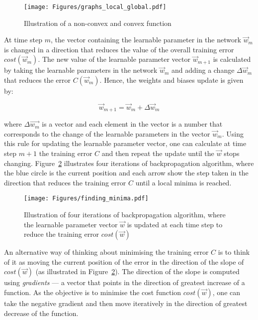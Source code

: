 \begin{figure}[ht!]
	\begin{center}
		\texttt{[image: Figures/graphs\_local\_global.pdf]}
	\end{center}
	\caption{Illustration of a non-convex and convex function}
	\label{Fig:local_global}
\end{figure} 

At time step $m$, the vector containing the learnable parameter in the network $\vec{w}_m$ is changed in a direction that reduces the value of the overall training error $cost(\vec{w}_m)$. The new value of the learnable parameter vector $\vec{w}_{m+1}$ is calculated by taking the learnable parameters in the network $\vec{w}_m$ and adding a change $\Delta\vec{w}_m$ that reduces the error $C(\vec{w}_m)$. Hence, the weights and biases update is given by:

\begin{equation*}
\vec{w}_{m+1}=\vec{w}_{m}+\Delta \vec{w}_{m}
\end{equation*}

where $\Delta \vec{w_m}$ is a vector and each element in the vector is a number that corresponds to the change of the learnable parameters in the vector $\vec{w}_m$. Using this rule for updating the learnable parameter vector, one can calculate at time step $m+1$ the training error $C$ and then repeat the update until the $\vec{w}$ stops changing. Figure~\ref{Fig:finding_minima} illustrates four iterations of backpropagation algorithm, where the blue circle is the current position and each arrow show the step taken in the direction that reduces the training error $C$  until a local minima is reached. 

\begin{figure}[ht!]
	\begin{center}
		\texttt{[image: Figures/finding\_minima.pdf]}
	\end{center}
	\caption{Illustration of four iterations of backpropagation algorithm, where the learnable parameter vector $\vec{w}$ is updated at each time step to reduce the training error $cost(\vec{w})$ }
	\label{Fig:finding_minima}
\end{figure} 

An alternative way of thinking about minimising the training error $C$ is to think of it as moving the current position of the error in the direction of the slope of $cost(\vec{w})$ (as illustrated in Figure~\ref{Fig:finding_minima}). The direction of the slope is computed using \textit{gradients} --- a vector that points in the direction of greatest increase of a function. As the objective is to minimise the cost function $cost(\vec{w})$, one can take the negative gradient and then move iteratively in the direction of greatest decrease of the function. 

